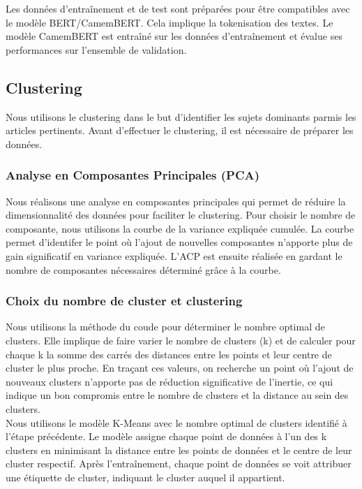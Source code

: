 \documentclass{article}
\begin{document}
Les données d'entraînement et de test sont préparées pour être compatibles avec le modèle BERT/CamemBERT. Cela implique la tokenisation des textes. Le modèle CamemBERT est entraîné sur les données d'entraînement et évalue ses performances sur l'ensemble de validation.

\subsection{Clustering}
Nous utilisons le clustering dans le but d'identifier les sujets dominants parmis les articles pertinents. Avant d'effectuer le clustering, il est nécessaire de préparer les données.

\subsubsection{Analyse en Composantes Principales (PCA)}
Nous réalisons une analyse en composantes principales qui permet de réduire la dimensionnalité des données pour faciliter le clustering. Pour choisir le nombre de composante, nous utilisons la courbe de la variance expliquée cumulée. La courbe permet d'identifer le point où l'ajout de nouvelles composantes n'apporte plus de gain significatif en variance expliquée. L'ACP est ensuite réalisée en gardant le nombre de composantes nécessaires déterminé grâce à la courbe.

\subsubsection{Choix du nombre de cluster et clustering}
Nous utilisons la méthode du coude pour déterminer le nombre optimal de clusters. Elle implique de faire varier le nombre de clusters (k) et de calculer pour chaque k la somme des carrés des distances entre les points et leur centre de cluster le plus proche. En traçant ces valeurs, on recherche un point où l'ajout de nouveaux clusters n'apporte pas de réduction significative de l'inertie, ce qui indique un bon compromis entre le nombre de clusters et la distance au sein des clusters. \\

Nous utilisons le modèle K-Means avec le nombre optimal de clusters identifié à l'étape précédente. Le modèle assigne chaque point de données à l'un des k clusters en minimisant la distance entre les points de données et le centre de leur cluster respectif. Après l'entraînement, chaque point de données se voit attribuer une étiquette de cluster, indiquant le cluster auquel il appartient.
\end{document}
